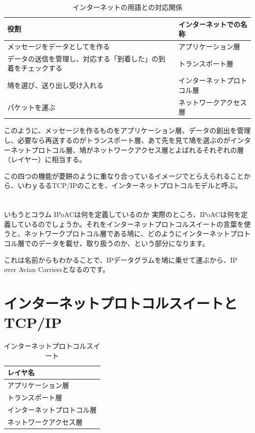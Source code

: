 \begin{table}[hbtp] 
\begin{center} \label{hatostack2}
	\begin{tabular}{ll} \toprule
		役割 & インターネットでの名称 \\ \midrule
		メッセージをデータとしてを作る & アプリケーション層 \\
		データの送信を管理し、対応する「到着した」の到着をチェックする & トランスポート層 \\
		鳩を選び、送り出し受け入れる & インターネットプロトコル層 \\
		パケットを運ぶ & ネットワークアクセス層 \\ \bottomrule
	\end{tabular}
\end{center} \caption{インターネットの用語との対応関係}
\end{table} 

このように、メッセージを作るものをアプリケーション層、データの創出を管理し、必要なら再送するのがトランスポート層、あて先を見て鳩を選ぶのがインターネットプロトコル層、鳩がネットワークアクセス層とよばれるそれぞれの層（レイヤー）に相当する。

この四つの機能が菱餅のように重なり合っているイメージでとらえられることから、いわｙるるTCP/IPのことを、インターネットプロトコルモデルと呼ぶ。


\section*{}
\begin{itembox}[l]{いもうとコラム IPoACは何を定義しているのか}
実際のところ、IPoACは何を定義しているのでしょうか。それをインターネットプロトコルスイートの言葉を使うと、ネットワークプロトコル層である鳩に、どのようにインターネットプロトコル層でのデータを載せ、取り扱うのか、という部分になります。

これは名前からもわかることで、IPデータグラムを鳩に乗せて運ぶから、IP over Avian Carriersとなるのです。

\end{itembox}


\section{インターネットプロトコルスイートとTCP/IP}

\begin{table}[hbtp] 
\begin{center} \label{internetprotocolsuite}
	\begin{tabular}{l}  \toprule 
		レイヤ名 \\ \midrule
		アプリケーション層 \\
		トランスポート層 \\
		インターネットプロトコル層 \\
		ネットワークアクセス層 \\ \bottomrule
	\end{tabular} \caption{インターネットプロトコルスイート}
\end{center}
\end{table}

